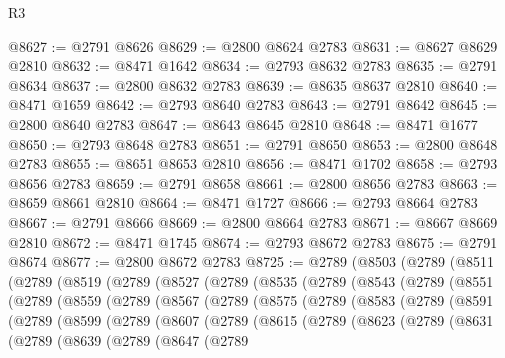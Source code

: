 \begin{lexlean}{R3}
\begin{coremodule}
@8627 := @2791 @8626
@8629 := @2800 @8624 @2783
@8631 := @8627 @8629 @2810
@8632 := @8471 @1642
@8634 := @2793 @8632 @2783
@8635 := @2791 @8634
@8637 := @2800 @8632 @2783
@8639 := @8635 @8637 @2810
@8640 := @8471 @1659
@8642 := @2793 @8640 @2783
@8643 := @2791 @8642
@8645 := @2800 @8640 @2783
@8647 := @8643 @8645 @2810
@8648 := @8471 @1677
@8650 := @2793 @8648 @2783
@8651 := @2791 @8650
@8653 := @2800 @8648 @2783
@8655 := @8651 @8653 @2810
@8656 := @8471 @1702
@8658 := @2793 @8656 @2783
@8659 := @2791 @8658
@8661 := @2800 @8656 @2783
@8663 := @8659 @8661 @2810
@8664 := @8471 @1727
@8666 := @2793 @8664 @2783
@8667 := @2791 @8666
@8669 := @2800 @8664 @2783
@8671 := @8667 @8669 @2810
@8672 := @8471 @1745
@8674 := @2793 @8672 @2783
@8675 := @2791 @8674
@8677 := @2800 @8672 @2783
@8725 := @2789
    (@8503
      (@2789
        (@8511
          (@2789
            (@8519
              (@2789
                (@8527
                  (@2789
                    (@8535
                      (@2789
                        (@8543
                          (@2789
                            (@8551
                              (@2789
                                (@8559
                                  (@2789
                                    (@8567
                                      (@2789
                                        (@8575
                                          (@2789
                                            (@8583
                                              (@2789
                                                (@8591
                                                  (@2789
                                                    (@8599
                                                      (@2789
                                                        (@8607
                                                          (@2789
                                                            (@8615
                                                              (@2789
                                                                (@8623
                                                                  (@2789
                                                                    (@8631
                                                                      (@2789
                                                                        (@8639
                                                                          (@2789
                                                                            (@8647
                                                                              (@2789

\end{coremodule}
\end{lexlean}
